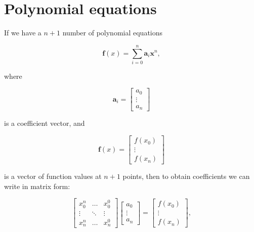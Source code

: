 \documentclass[10pt,b5paper,titlepage]{book}
\begin{document}
\section{Polynomial equations}

If we have a $n + 1$ number of polynomial equations

\begin{equation}
    \mathbf{f}(x) = \sum_{i=0}^{n} \mathbf{a}_i \mathbf{x}^n
,\end{equation}

where

\begin{equation}
    \mathbf{a}_{i} =
    \begin{bmatrix}
        a_{0} \\
        \vdots \\
        a_{n}
    \end{bmatrix}
\end{equation}

is a coefficient vector, and

\begin{equation}
    \mathbf{f}(x) =
    \begin{bmatrix}
        f(x_{0}) \\
        \vdots \\
        f(x_{n})
    \end{bmatrix}
\end{equation}

is a vector of function values at $n + 1$ points, then to obtain coefficients
we can write in matrix form:

\begin{equation}
    \begin{bmatrix}
        x_0^{n} & \ldots & x_0^{0} \\
        \vdots & \ddots & \vdots \\
        x_{n}^{n} & \ldots & x_{n}^{0}
    \end{bmatrix}
    \begin{bmatrix}
        a_{0} \\
        \vdots \\
        a_{n}
    \end{bmatrix}
    =
    \begin{bmatrix}
        f(x_{0}) \\
        \vdots \\
        f(x_{n})
    \end{bmatrix}
,\end{equation}
\end{document}
